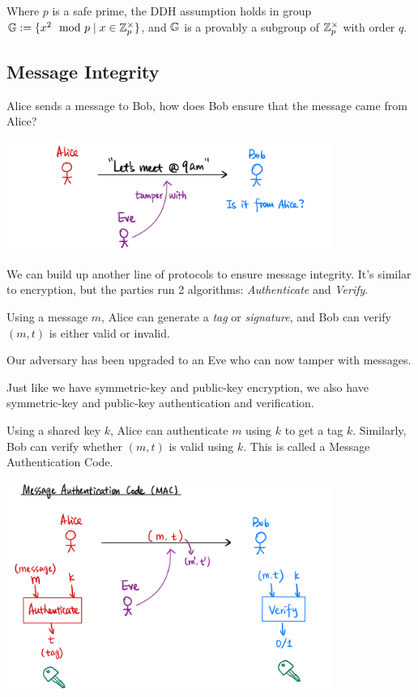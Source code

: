 Where $p$ is a safe prime, the DDH assumption holds in group $\mathbb G := \{x^2 \mod p  \mid  x \in \mathbb Z_p^\times\}$, and $\mathbb G$ is a provably a subgroup of $\mathbb Z_p^\times$ with order $q$.

\subsection{Message Integrity}
Alice sends a message to Bob, how does Bob ensure that the message came from Alice?

\begin{center}
    \includegraphics[width=0.8\textwidth]{images/2023-02-02/integrity.png}
\end{center}

We can build up another line of protocols to ensure message integrity. It's similar to encryption, but the parties run 2 algorithms: \emph{Authenticate} and \emph{Verify}.

Using a message $m$, Alice can generate a \emph{tag} or \emph{signature}, and Bob can verify $(m, t)$ is either valid or invalid.

Our adversary has been upgraded to an Eve who can now tamper with messages.

Just like we have symmetric-key and public-key encryption, we also have symmetric-key and public-key authentication and verification.

Using a shared key $k$, Alice can authenticate $m$ using $k$ to get a tag $k$. Similarly, Bob can verify whether $(m, t)$ is valid using $k$. This is called a Message Authentication Code.

\begin{center}
    \includegraphics[width=0.8\textwidth]{images/2023-02-02/mac.png}
\end{center}


